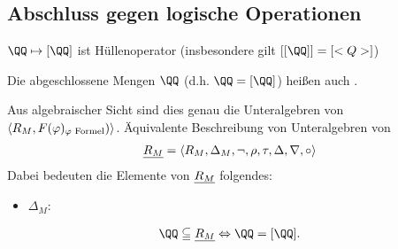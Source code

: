 \subsection*{Abschluss gegen logische Operationen}
\begin{*remark}
	\begin{remarkenum}
		\item $\QQ \mapsto [\QQ]$ ist Hüllenoperator (insbesondere gilt $[[\QQ]] = [\Q]$)
		\item Die abgeschlossene Mengen $\QQ$ (d.h. $\QQ = [\QQ]$) heißen auch .
	\end{remarkenum}
	Aus algebraischer Sicht sind dies genau die Unteralgebren von $\langle R_M, F(\varphi)_{\varphi \text{ Formel}}) \rangle$. Äquivalente Beschreibung von Unteralgebren von
	\begin{align*}
		\underline{R_M} = \langle R_M, \Delta_M, \neg, \rho, \tau, \Delta, \nabla, \circ \rangle
	\end{align*}
	Dabei bedeuten die Elemente von $\underline{R_M}$ folgendes:
	\begin{itemize}
		\item $\Delta_M$: %
	\end{itemize}
	\begin{align*}
		\QQ \subseteqq \ul{R_M} \equival \QQ = [\QQ].
	\end{align*}
\end{*remark}